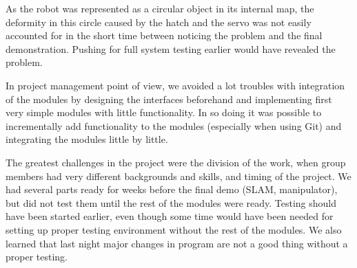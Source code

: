 \documentclass[a4paper,10pt]{article}
\begin{document}
As the robot was represented as a circular object in its internal map, the deformity in this circle caused by the hatch and the servo was not easily accounted for in the short time between noticing the problem and the final demonstration. Pushing for full system testing earlier would have revealed the problem.

In project management point of view, we avoided a lot troubles with integration of the modules by designing the interfaces beforehand and implementing first very simple modules with little functionality. In so doing it was possible to incrementally add functionality to the modules (especially when using Git) and integrating the modules little by little.

The greatest challenges in the project were the division of the work, when group members had very different backgrounds and skills, and timing of the project. We had several parts ready for weeks before the final demo (SLAM, manipulator), but did not test them until the rest of the modules were ready. Testing should have been started earlier, even though some time would have been needed for setting up proper testing environment without the rest of the modules. We also learned that last night major changes in program are not a good thing without a proper testing.






%

\end{document}
